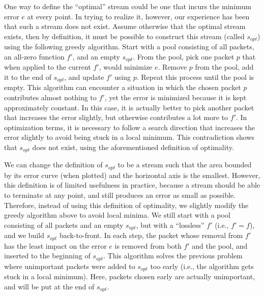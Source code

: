 One way to define the ``optimal'' stream could be one that incurs the minimum error $e$ at every
point. In trying to realize it, however, our experience has been that such a stream does not exist.
Assume otherwise that the optimal stream exists, then by definition, it must be possible to
construct this stream (called $s_{opt}$) using the following greedy algorithm. Start with a pool
consisting of all packets, an all-zero function $f'$, and an empty $s_{opt}$. From the pool, pick
one packet $p$ that when applied to the current $f'$, would minimize $e$. Remove $p$ from the pool,
add it to the end of $s_{opt}$, and update $f'$ using $p$. Repeat this process until the pool is
empty. This algorithm can encounter a situation in which the chosen packet $p$ contributes almost
nothing to $f'$, yet the error is minimized because it is kept approximately constant. In this case,
it is actually better to pick another packet that increases the error slightly, but otherwise
contributes a lot more to $f'$. In optimization terms, it is necessary to follow a search direction
that increases the error slightly to avoid being stuck in a local minimum. This contradiction shows
that $s_{opt}$ does not exist, using the aforementioned definition of optimality.

We can change the definition of $s_{opt}$ to be a stream such that the area bounded by its error
curve (when plotted) and the horizontal axis is the smallest. However, this definition is of limited
usefulness in practice, because a stream should be able to terminate at any point, and still
produces an error as small as possible. Therefore, instead of using this definition of optimality,
we slightly modify the greedy algorithm above to avoid local minima. We still start with a pool
consisting of all packets and an empty $s_{opt}$, but with a ``lossless'' $f'$ (i.e., $f'=f$), and
we build $s_{opt}$ back-to-front. In each step, the packet whose removal from $f'$ has the least
impact on the error $e$ is removed from both $f'$ and the pool, and inserted to the beginning of
$s_{opt}$. This algorithm solves the previous problem where unimportant packets were added to
$s_{opt}$ too early (i.e., the algorithm gets stuck in a local minimum). Here, packets chosen early
are actually unimportant, and will be put at the end of $s_{opt}$.

